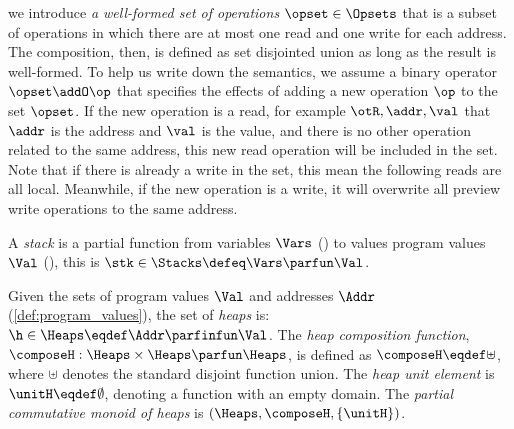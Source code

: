 we introduce \emph{a well-formed set of operations} \( \opset \in \Opsets\) that is a subset of operations in which there are at most one read and one write for each address.
The composition, then, is defined as set disjointed union as long as the result is well-formed.
To help us write down the semantics, we assume a binary operator \( \opset \addO \op \) that specifies the effects of adding a new operation \( \op \) to the set \( \opset \).
If the new operation is a read, for example \(\otR, \addr, \val\) that \( \addr \) is the address and \( \val\) is the value, and there is no other operation related to the same address, this new read operation will be included in the set.
Note that if there is already a write in the set, this mean the following reads are all local.
Meanwhile, if the new operation is a write, it will overwrite all preview write operations to the same address.


\begin{defn}[Stacks]
\label{def:stacks}
A \emph{stack} is a partial function from variables \( \Vars \) () to values program values \( \Val \) (), this is \( \stk \in \Stacks \defeq \Vars \parfun \Val \).
\end{defn}


\begin{definition}[Heaps]
\label{def:heaps}
Given the sets of program values $\Val$  and addresses \( \Addr\)  (\ref{def:program_values}), the set of \emph{heaps} is: $\h \in \Heaps \eqdef \Addr \parfinfun \Val$.
The \emph{heap composition function}, $\composeH: \Heaps \times \Heaps \parfun \Heaps$, is defined as $\composeH \eqdef \uplus$, where $\uplus$ denotes the standard disjoint function union. The \emph{ heap unit element} is $\unitH \eqdef \emptyset$, denoting a function with an empty domain.
The \emph{partial commutative monoid of  heaps} is $(\Heaps, \composeH, \{\unitH\})$.
\end{definition}

